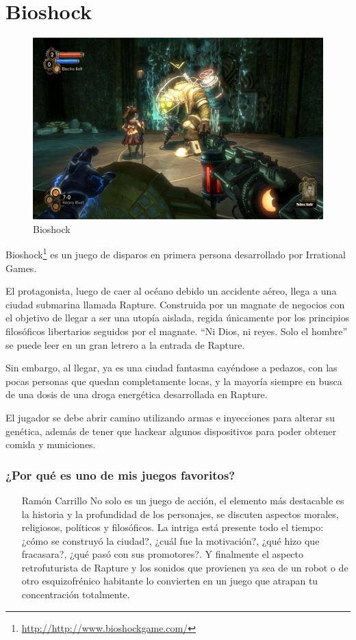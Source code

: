 \section{Bioshock}

\begin{figure}[htbp]
\begin{center}
\includegraphics[width=.60\textwidth]{./imagenes/bioshock.jpg}
\caption{Bioshock}
\label{Bioshock}
\end{center}
\end{figure}
Bioshock\footnote{\url{http://http://www.bioshockgame.com/}} es un juego de disparos en primera persona desarrollado por Irrational Games.

El protagonista, luego de caer al océano debido un accidente aéreo, llega a una ciudad submarina llamada Rapture. Construida por un magnate de negocios con el objetivo de llegar a ser una utopía aislada, regida únicamente por los principios filosóficos libertarios seguidos por el magnate. ``Ni Dios, ni reyes. Solo el hombre'' se puede leer en un gran letrero a la entrada de Rapture.

Sin embargo, al llegar, ya es una ciudad fantasma cayéndose a pedazos, con las pocas personas que quedan completamente locas, y la mayoría siempre en busca de una dosis de una droga energética desarrollada en Rapture.

El jugador se debe abrir camino utilizando armas e inyecciones para alterar su genética, además de tener que hackear algunos dispositivos para poder obtener comida y municiones.

\subsubsection{¿Por qué es uno de mis juegos favoritos?}
\begin{itemize}
\item[Ramón Carrillo] No solo es un juego de acción, el elemento más destacable es la historia y la profundidad de los personajes, se discuten aspectos morales, religiosos, políticos y filosóficos. La intriga está presente todo el tiempo: ¿cómo se construyó la ciudad?, ¿cuál fue la motivación?, ¿qué hizo que fracasara?, ¿qué pasó con sus promotores?. Y finalmente el aspecto retrofuturista de Rapture y los sonidos que provienen ya sea de un robot o de otro esquizofrénico habitante lo convierten en un juego que atrapan tu concentración totalmente.
\end{itemize}
